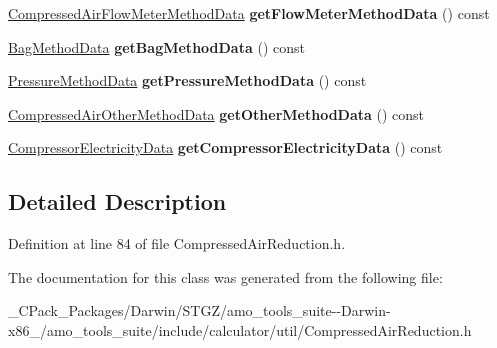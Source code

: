 \begin{DoxyCompactItemize}
\mbox{\label{class_compressed_air_reduction_input_a86a26c458e9d31bb212e341ced01573b}} 
\hyperlink{class_compressed_air_flow_meter_method_data}{Compressed\+Air\+Flow\+Meter\+Method\+Data} {\bfseries get\+Flow\+Meter\+Method\+Data} () const
\item 
\mbox{\label{class_compressed_air_reduction_input_ab781dbcec839e6b8a88de77ab8b0773f}} 
\hyperlink{class_bag_method_data}{Bag\+Method\+Data} {\bfseries get\+Bag\+Method\+Data} () const
\item 
\mbox{\label{class_compressed_air_reduction_input_af2fb0dba0ce5b923800eaea5545c2b1c}} 
\hyperlink{class_pressure_method_data}{Pressure\+Method\+Data} {\bfseries get\+Pressure\+Method\+Data} () const
\item 
\mbox{\label{class_compressed_air_reduction_input_a99e59b1df80be318f98140e62368fee7}} 
\hyperlink{class_compressed_air_other_method_data}{Compressed\+Air\+Other\+Method\+Data} {\bfseries get\+Other\+Method\+Data} () const
\item 
\mbox{\label{class_compressed_air_reduction_input_a17e939dbbe29dc285967a0e34cb4b113}} 
\hyperlink{class_compressor_electricity_data}{Compressor\+Electricity\+Data} {\bfseries get\+Compressor\+Electricity\+Data} () const
\end{DoxyCompactItemize}


\subsection{Detailed Description}


Definition at line 84 of file Compressed\+Air\+Reduction.\+h.



The documentation for this class was generated from the following file\+:\begin{DoxyCompactItemize}
\item 
\+\_\+\+C\+Pack\+\_\+\+Packages/\+Darwin/\+S\+T\+G\+Z/amo\+\_\+tools\+\_\+suite-\/-\/\+Darwin-\/x86\+\_/amo\+\_\+tools\+\_\+suite/include/calculator/util/Compressed\+Air\+Reduction.\+h\end{DoxyCompactItemize}
